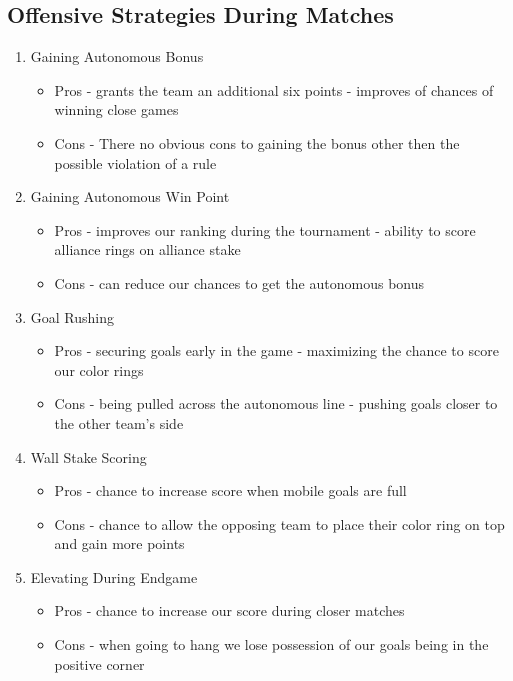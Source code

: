 \subsection{Offensive Strategies During Matches}
\begin{enumerate}
    \item Gaining Autonomous Bonus
    \begin{itemize}
    \item Pros 
    \subitem - grants the team an additional six points
    \subitem - improves of chances of winning close games
    \item Cons
    \subitem - There no obvious cons to gaining the bonus other then the possible violation of a rule
    \end{itemize}
    \item Gaining Autonomous Win Point
    \begin{itemize}
    \item Pros
    \subitem - improves our ranking during the tournament
    \subitem - ability to score alliance rings on alliance stake
    \item Cons
    \subitem - can reduce our chances to get the autonomous bonus
    \end{itemize}
    \item Goal Rushing
    \begin{itemize}
    \item Pros
    \subitem - securing goals early in the game
    \subitem - maximizing the chance to score our color rings
    \item Cons
    \subitem - being pulled across the autonomous line 
    \subitem - pushing goals closer to the other team's side
    \end{itemize}
    \item Wall Stake Scoring
    \begin{itemize}
    \item Pros
    \subitem - chance to increase score when mobile goals are full
    \item Cons
    \subitem - chance to allow the opposing team to place their color ring on top and gain more points
    \end{itemize}
    \item Elevating During Endgame
    \begin{itemize}
    \item Pros
    \subitem - chance to increase our score during closer matches
    \item Cons
    \subitem - when going to hang we lose possession of our goals being in the positive corner
    \end{itemize}
\end{enumerate}


